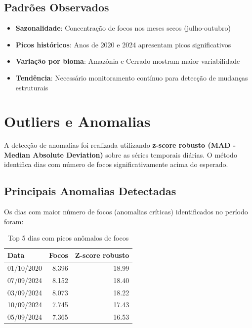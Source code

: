 \documentclass[12pt,a4paper]{report}
\begin{document}
\subsection{Padrões Observados}

\begin{itemize}
  \item \textbf{Sazonalidade}: Concentração de focos nos meses secos (julho-outubro)
  \item \textbf{Picos históricos}: Anos de 2020 e 2024 apresentam picos significativos
  \item \textbf{Variação por bioma}: Amazônia e Cerrado mostram maior variabilidade
  \item \textbf{Tendência}: Necessário monitoramento contínuo para detecção de mudanças estruturais
\end{itemize}

\section{Outliers e Anomalias}

A detecção de anomalias foi realizada utilizando \textbf{z-score robusto (MAD - Median Absolute Deviation)} sobre as séries temporais diárias. O método identifica dias com número de focos significativamente acima do esperado.

\subsection{Principais Anomalias Detectadas}

Os dias com maior número de focos (anomalias críticas) identificados no período foram:

\begin{table}[h]
\centering
\caption{Top 5 dias com picos anômalos de focos}
\label{tab:anomalias}
\begin{tabular}{lrr}
\toprule
\textbf{Data} & \textbf{Focos} & \textbf{Z-score robusto} \\
\midrule
01/10/2020 & 8.396 & 18.99 \\
07/09/2024 & 8.152 & 18.40 \\
03/09/2024 & 8.073 & 18.22 \\
10/09/2024 & 7.745 & 17.43 \\
05/09/2024 & 7.365 & 16.53 \\
\bottomrule
\end{tabular}
\end{table}
\end{document}
